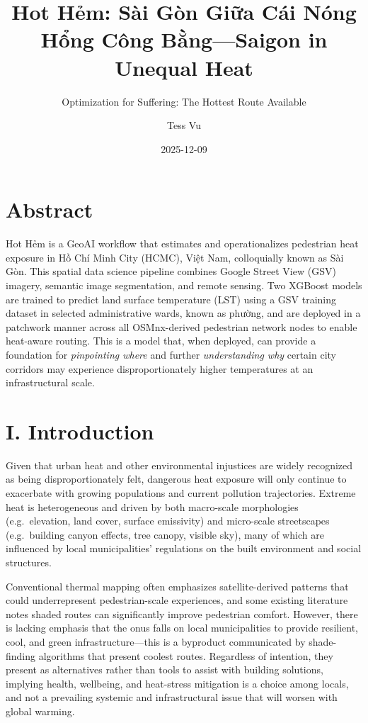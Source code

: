 \documentclass[
]{report}
\title{Hot Hẻm: Sài Gòn Giữa Cái Nóng Hổng Công Bằng---Saigon in Unequal
Heat}
\subtitle{Optimization for Suffering: The Hottest Route Available}
\author{Tess Vu}
\date{2025-12-09}
\begin{document}
\maketitle


\chapter{Abstract}\label{abstract}

Hot Hẻm is a GeoAI workflow that estimates and operationalizes
pedestrian heat exposure in Hồ Chí Minh City (HCMC), Việt Nam,
colloquially known as Sài Gòn. This spatial data science pipeline
combines Google Street View (GSV) imagery, semantic image segmentation,
and remote sensing. Two XGBoost models are trained to predict land
surface temperature (LST) using a GSV training dataset in selected
administrative wards, known as phường, and are deployed in a patchwork
manner across all OSMnx-derived pedestrian network nodes to enable
heat-aware routing. This is a model that, when deployed, can provide a
foundation for \emph{pinpointing where} and further \emph{understanding
why} certain city corridors may experience disproportionately higher
temperatures at an infrastructural scale.

\chapter{I. Introduction}\label{i.-introduction}

Given that urban heat and other environmental injustices are widely
recognized as being disproportionately felt, dangerous heat exposure
will only continue to exacerbate with growing populations and current
pollution trajectories. Extreme heat is heterogeneous and driven by both
macro-scale morphologies (e.g.~elevation, land cover, surface
emissivity) and micro-scale streetscapes (e.g.~building canyon effects,
tree canopy, visible sky), many of which are influenced by local
municipalities' regulations on the built environment and social
structures.

Conventional thermal mapping often emphasizes satellite-derived patterns
that could underrepresent pedestrian-scale experiences, and some
existing literature notes shaded routes can significantly improve
pedestrian comfort. However, there is lacking emphasis that the onus
falls on local municipalities to provide resilient, cool, and green
infrastructure---this is a byproduct communicated by shade-finding
algorithms that present coolest routes. Regardless of intention, they
present as alternatives rather than tools to assist with building
solutions, implying health, wellbeing, and heat-stress mitigation is a
choice among locals, and not a prevailing systemic and infrastructural
issue that will worsen with global warming.
\end{document}
